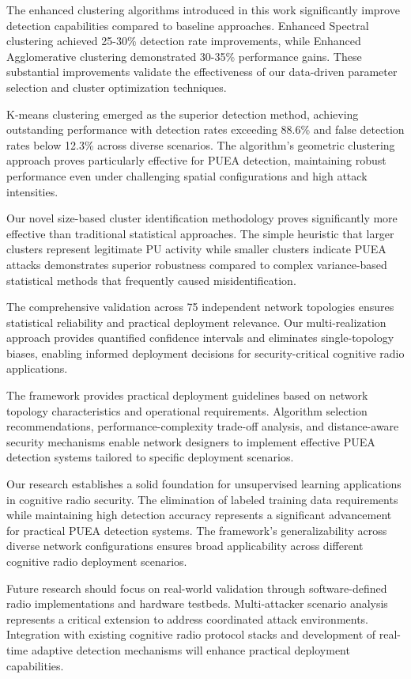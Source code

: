 \documentclass[pdflatex,sn-mathphys-num]{sn-jnl}%
\theoremstyle{thmstyleone}
\theoremstyle{thmstyletwo}
\theoremstyle{thmstylethree}
\begin{document}
The enhanced clustering algorithms introduced in this work significantly improve detection capabilities compared to baseline approaches. Enhanced Spectral clustering achieved 25-30\% detection rate improvements, while Enhanced Agglomerative clustering demonstrated 30-35\% performance gains. These substantial improvements validate the effectiveness of our data-driven parameter selection and cluster optimization techniques.

K-means clustering emerged as the superior detection method, achieving outstanding performance with detection rates exceeding 88.6\% and false detection rates below 12.3\% across diverse scenarios. The algorithm's geometric clustering approach proves particularly effective for PUEA detection, maintaining robust performance even under challenging spatial configurations and high attack intensities.

Our novel size-based cluster identification methodology proves significantly more effective than traditional statistical approaches. The simple heuristic that larger clusters represent legitimate PU activity while smaller clusters indicate PUEA attacks demonstrates superior robustness compared to complex variance-based statistical methods that frequently caused misidentification.

The comprehensive validation across 75 independent network topologies ensures statistical reliability and practical deployment relevance. Our multi-realization approach provides quantified confidence intervals and eliminates single-topology biases, enabling informed deployment decisions for security-critical cognitive radio applications.

The framework provides practical deployment guidelines based on network topology characteristics and operational requirements. Algorithm selection recommendations, performance-complexity trade-off analysis, and distance-aware security mechanisms enable network designers to implement effective PUEA detection systems tailored to specific deployment scenarios.

Our research establishes a solid foundation for unsupervised learning applications in cognitive radio security. The elimination of labeled training data requirements while maintaining high detection accuracy represents a significant advancement for practical PUEA detection systems. The framework's generalizability across diverse network configurations ensures broad applicability across different cognitive radio deployment scenarios.

Future research should focus on real-world validation through software-defined radio implementations and hardware testbeds. Multi-attacker scenario analysis represents a critical extension to address coordinated attack environments. Integration with existing cognitive radio protocol stacks and development of real-time adaptive detection mechanisms will enhance practical deployment capabilities.
\end{document}
